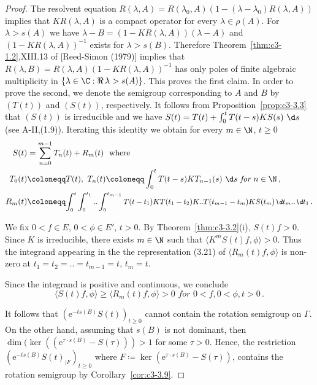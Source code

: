 \begin{proof}
	The resolvent equation $R(\lambda,A) = R(\lambda_{0},A)(1 - (\lambda-\lambda_{0})R(\lambda,A))$ implies that $KR(\lambda,A)$ is a compact operator for every $\lambda \in \rho(A)$. 
	For $\lambda > s(A)$ we have $\lambda - B = (1 - KR(\lambda,A))(\lambda-A)$ and $(1 - KR(\lambda,A))^{-1}$ exists for $\lambda > s(B)$.
	Therefore Theorem~\ref{thm:c3-1.2},XIII.13 of [Reed-Simon (1979)] 
	implies that $R(\lambda,B) = R(\lambda,A)(1 - KR(\lambda,A))^{-1}$ has only poles of finite algebraic multiplicity in $\{\lambda \in \C  : \Re\,\lambda > s(A)\}$. 
	This proves the first claim. 
	In order to prove the second, we denote the semigroup corresponding to $A$ and $B$ by $(T(t))$ and $(S(t))$,  respectively.
	It follows from Proposition~\ref{prop:c3-3.3} that $(S(t))$ is irreducible and we have $S(t) = T(t) + \int_{0}^{t} T(t-s)KS(s)~\d s$ (see A-II,(1.9)). 
	Iterating this identity we obtain for every $m \in \N$, $t \geq 0$
	\begin{equation}\label{eq:c3-3.21}
		\begin{aligned}
		S(t) &= \sum_{n=0}^{m-1} T_{n}(t) + R_{m}(t) \ \text{ where}\\
		T_{0}(t)&\coloneqq T(t),\  T_{n}(t) \coloneqq  \int_{0}^{t} T(t-s)KT_{n-1}(s)~\d s \textit{ for } n \in \N\,,\\
		R_{m}(t) &\coloneqq \textit{\small $\int_{0}^{t}\int_{0}^{t_{1}} .. \int_{0}^{t_{m-1}} T(t-t_{1})KT(t_{1}-t_{2})K .. T(t_{m-1}-t_m)KS(t_{m})\d t _{m}..\d t _{1}$}\,.
		\end{aligned}
	\end{equation} 
	
	We fix $0 < f \in E$, $0 < \phi \in E'$, $t > 0$. 
	By Theorem~\ref{thm:c3-3.2}(i), $S(t)f > 0$.
	Since $K$ is irreducible, there exists $m \in \N$ such that $\langle K^{m}S(t)f,\phi\rangle > 0$. 
	Thus the integrand appearing in the the representation (3.21) of $\langle R_{m}(t)f,\phi\rangle$ is non-zero at $t_{1}=t_{2}= .. =t_{m-1}=t$, $t_{m}= t$.
	
	Since the integrand is positive and continuous, we conclude
	\begin{equation}\label{eq:c3-3.22}
		\textit{$\langle S(t)f,\phi\rangle \geq \langle R_{m}(t)f,\phi\rangle > 0$ \ for \ $0 < f, 0 < \phi, t > 0$}\,.
	\end{equation}
	
	It follows that $(\mathrm{e}^{-ts(B)}S(t))_{t \geq 0}$ cannot contain the rotation semigroup on $\Gamma$. 
	On the other hand, assuming that $s(B)$ is not dominant, then $\dim(\ker((\mathrm{e}^{\tau\cdot s(B)} - S(\tau))) > 1$ for some $\tau > 0$. 
	Hence, the restriction $(\mathrm{e}^{-ts(B)}S(t)_{|F})_{t \geq 0}$ where $F \coloneqq  \ker(\mathrm{e}^{\tau\cdot s(B)}- S(\tau))$, contains the rotation semigroup by Corollary~\ref{cor:c3-3.9}.
\end{proof}

